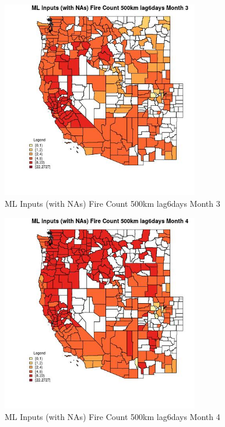 \begin{figure} 
\centering  
\includegraphics[width=0.77\textwidth]{Code_Outputs/Report_ML_input_PM25_Step4_part_f_de_duplicated_aveswNAs_CountyFire_Count_500km_lag6daysmedianMonth3.jpg} 
\caption{\label{fig:Report_ML_input_PM25_Step4_part_f_de_duplicated_aveswNAsCountyFire_Count_500km_lag6daysmedianMonth3}ML Inputs (with NAs) Fire Count 500km lag6days Month 3} 
\end{figure} 
 

\begin{figure} 
\centering  
\includegraphics[width=0.77\textwidth]{Code_Outputs/Report_ML_input_PM25_Step4_part_f_de_duplicated_aveswNAs_CountyFire_Count_500km_lag6daysmedianMonth4.jpg} 
\caption{\label{fig:Report_ML_input_PM25_Step4_part_f_de_duplicated_aveswNAsCountyFire_Count_500km_lag6daysmedianMonth4}ML Inputs (with NAs) Fire Count 500km lag6days Month 4} 
\end{figure} 
 

